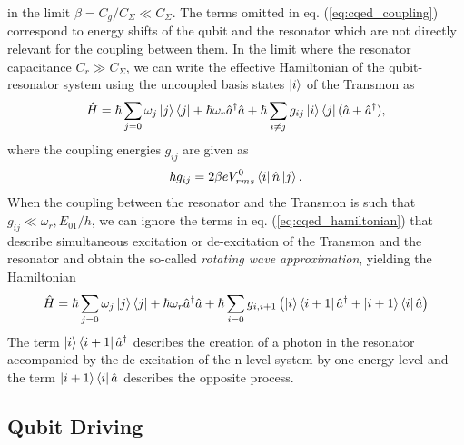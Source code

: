 %
in the limit $\beta = C_g/C_\Sigma \ll C_\Sigma$. The terms omitted in eq. (\ref{eq:cqed_coupling}) correspond to energy shifts of the qubit and the resonator which are not directly relevant for the coupling between them. 
 In the limit where the resonator capacitance $C_r \gg C_\Sigma$, we can write the effective Hamiltonian of the qubit-resonator system using the uncoupled basis states $\left| i \right>$ of the Transmon as
%
\begin{equation}
\hat{H} = \hbar \sum\limits_{j=0} \omega_j \left| j \right>\left< j \right| + \hbar \omega_r \hat{a}^\dagger \hat{a} + \hbar \sum\limits_{i\ne j} g_{ij} \left| i \right>\left< j \right|(\hat{a}+\hat{a}^\dagger), \label{eq:cqed_hamiltonian}
\end{equation}
%
where the coupling energies $g_{ij}$ are given as
%
\begin{equation}
\hbar g_{ij} = 2\beta e V_{rms}^0 \left< i \right|\hat{n}\left| j \right>.
\end{equation}
%
When the coupling between the resonator and the Transmon is such that $g_{ij} \ll \omega_r,E_{01}/h$, we can ignore the terms in eq. (\ref{eq:cqed_hamiltonian}) that describe simultaneous excitation or de-excitation of the Transmon and the resonator and obtain the so-called {\it rotating wave approximation}, yielding the Hamiltonian
%
\begin{equation}
\hat{H} = \hbar \sum\limits_{j=0} \omega_j \left| j \right>\left< j \right|+\hbar \omega_r \hat{a}^\dagger \hat{a} + \hbar \sum\limits_{i=0} g_{i,i+1}\left(\left| i \right>\left< i+1 \right|\hat{a}^\dagger +\left| i+1 \right>\left< i \right|\hat{a}\right) \label{eq:cqed_rotating_wave}
\end{equation}
%
The term $\left| i \right>\left< i+1 \right|\hat{a}^\dagger$ describes the creation of a photon in the resonator accompanied by the de-excitation of the n-level system by one energy level and the term $\left| i+1 \right>\left< i \right|\hat{a}$ describes the opposite process.

\subsection{Qubit Driving}

